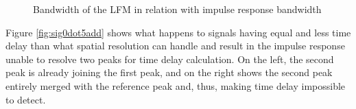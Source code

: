\documentclass[letterpaper, 12 pt, conference]{report}
\numberwithin{figure}{section}
\begin{document}
\begin{appendices}
\begin{figure}[h]
\noindent{}
\noindent{}
\caption{Bandwidth of the LFM in relation with impulse response bandwidth}
\label{fig:bwrelation}
\end{figure}


Figure \ref{fig:sig0dot5add} shows what happens to signals having equal and less time delay than what spatial resolution can handle and result in the impulse response unable to resolve two peaks for time delay calculation. On the left, the second peak is already joining the first peak, and on the right shows the second peak entirely merged with the reference peak and, thus, making time delay impossible to detect. \\




\end{appendices}
\end{document}
